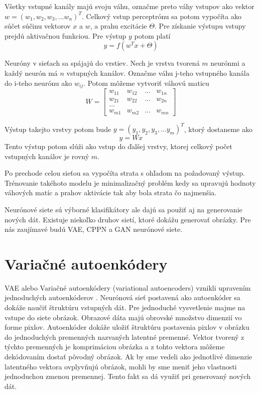 Všetky vstupné kanály majú svoju váhu, označme preto váhy vstupov ako vektor \(w = (w_1, w_2, w_3, ... w_n)^T\).
Celkový vstup perceptrónu sa potom vypočíta ako súčet súčinu vektorov \(x\) a \(w\), a prahu excitácie \(\Theta\).
Pre získanie výstupu vstupy prejdú aktivačnou funkciou.
Pre výstup \(y\) potom platí \[y = f(w^Tx + \Theta)\]

Neuróny v sieťach sa spájajú do vrstiev. Nech je vrstva tvorená \(m\) neurónmi a každý neurón má \(n\) vstupných kanálov.
Označme váhu j-teho vstupného kanála do i-teho neurónu ako \(w_{ij}\).
Potom môžeme vytvoriť váhovú maticu
\[
W = \begin{bmatrix}
		w_{11} & w_{12} & \dots & w_{1n} \\
		w_{21} & w_{22} & \dots & w_{2n} \\
		{...}							\\
		w_{m1} & w_{m2} & \dots & w_{mn}
     \end{bmatrix}
\]

Výstup takejto vrstvy potom bude \(y = (y_1, y_2, y_3, ... y_m)^T\), ktorý dostaneme ako \[y = Wx\]
Tento výstup potom slúži ako vstup do ďalšej vrstvy, ktorej celkový počet vstupných kanálov je rovný \(m\).

Po prechode celou sieťou sa vypočíta strata s ohľadom na požadovaný výstup.
Trénovanie takéhoto modelu je minimalizačný problém kedy sa upravujú hodnoty váhových matíc a prahov aktivácie tak aby bola strata čo najmenšia.

Neurónové siete sú výborné klasifikátory ale dajú sa použiť aj na generovanie nových dát.
Existuje niekoľko druhov sietí, ktoré dokážu generovať obrázky.
Pre nás zaujímavé budú VAE, CPPN a GAN neurónové siete. 

\section{Variačné autoenkódery}
VAE alebo Variačné autoenkódery (variational autoencoders) vznikli upravením jednoduchých autoenkóderov \cite{VAE}.
Neurónová sieť postavená ako autoenkóder sa dokáže naučiť štruktúru vstupných dát.
Pre jednoduché vysvetlenie majme na vstupe do siete obrázok.
Obrazové dáta majú obrovské množstvo dimenzií vo forme pixlov.
Autoenkóder dokáže uložiť štruktúru postavenia pixlov v obrázku do jednoduchých premenných nazvaných latentné premenné.
Vektor tvorený z týchto premenných je komprimáciou obrázka a z tohto vektora môžeme dekódovaním dostať pôvodný obrázok.
Ak by sme vedeli ako jednotlivé dimenzie latentného vektora ovplyvňujú obrázok, mohli by sme meniť jeho vlastnosti jednoduchou zmenou premennej.
Tento fakt sa dá využiť pri generovaný nových dát.

